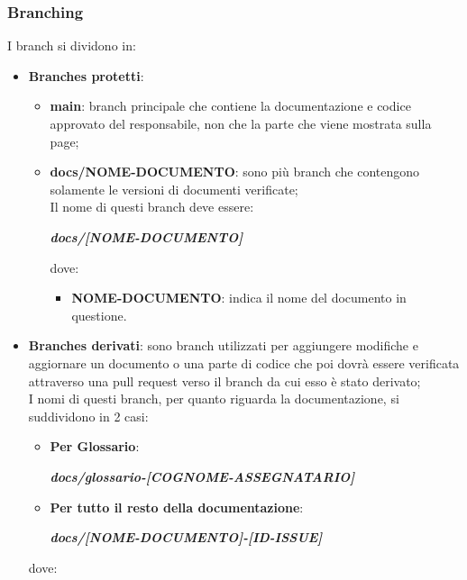         \subsubsection{Branching}\label{inf:branch}
        I branch si dividono in:
        \begin{itemize}
            \item \textbf{Branches protetti}: 
            \begin{itemize}
                \item \textbf{main}: branch principale che contiene la documentazione e codice approvato del responsabile, non che la parte che viene mostrata sulla page;
                \item \textbf{docs/NOME-DOCUMENTO}: sono più branch che contengono solamente le versioni di documenti verificate;\\
                Il nome di questi branch deve essere:
                \begin{center}
                    \textbf{\textit{docs/[NOME-DOCUMENTO]}}
                \end{center}
                dove:
                \begin{itemize}
                    \item \textbf{NOME-DOCUMENTO}: indica il nome del documento in questione.
                \end{itemize}
            \end{itemize}
            \item \textbf{Branches derivati}: sono branch utilizzati per aggiungere modifiche e aggiornare un documento o una parte di codice che poi dovrà essere verificata
            attraverso una pull request verso il branch da cui esso è stato derivato;\\
            I nomi di questi branch, per quanto riguarda la documentazione, si suddividono in 2 casi:
            \begin{itemize}
                \item \textbf{Per Glossario}:
                \begin{center}
                    \textbf{\textit{docs/glossario-[COGNOME-ASSEGNATARIO]}}
                \end{center}
                \item \textbf{Per tutto il resto della documentazione}:
                \begin{center}
                    \textbf{\textit{docs/[NOME-DOCUMENTO]-[ID-ISSUE]}}
                \end{center}
            \end{itemize}
            dove:
    

\end{itemize}
